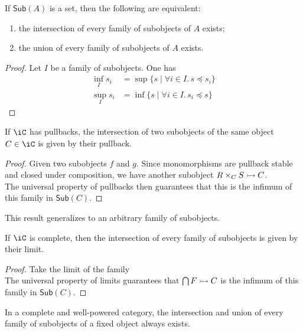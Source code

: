 \documentclass{amsart}
\begin{document}
\begin{prop}\label{prop:sub-set-intersections-unions}
  If $\mathsf{Sub}(A)$ is a set, then the following are equivalent:
  \begin{enumerate}
  \item the intersection of every family of subobjects of $A$ exists;
  \item the union of every family of subobjects of $A$ exists.
  \end{enumerate}
\end{prop}
\begin{proof}
  Let $I$ be a family of subobjects.
  One has
  \begin{align}
    \inf_{I}s_{i} &= \sup\{s \mid \forall i \in I.\,s \preceq s_{i}\}\\
    \sup_{I}s_{i} &= \inf\{s \mid \forall i \in I.\,s_{i} \preceq s\}
  \end{align}
\end{proof}

\begin{prop}
  If $\iC$ has pullbacks, the intersection of two subobjects of the same object $C \in \iC$ is given by their pullback.
\end{prop}
\begin{proof}
  Given two subobjects $f$ and $g$.
  Since monomorphisms are pullback stable and closed under composition, we have another subobject $R \times_{C} S \rightarrowtail C$.
  \[\]
  The universal property of pullbacks then guarantees that this is the infimum of this family in $\mathsf{Sub}(C)$.
\end{proof}

This result generalizes to an arbitrary family of subobjects.

\begin{prop}\label{prop:complete-intersection}
  If $\iC$ is complete, then the intersection of every family of subobjects is given by their limit.
\end{prop}
\begin{proof}
  Take the limit of the family
  \[\]
  The universal property of limits guarantees that $\bigcap F \rightarrowtail C$ is the infimum of this family in $\mathsf{Sub}(C)$.
\end{proof}

\begin{cor}
  In a complete and well-powered category, the intersection and union of every family of subobjects of a fixed object always exists.
\end{cor}
\end{document}

